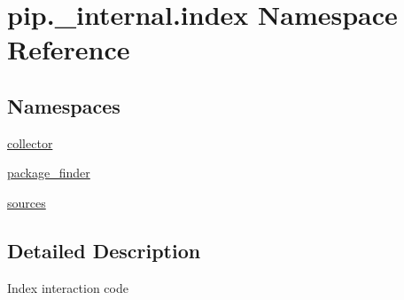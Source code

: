 \hypertarget{namespacepip_1_1__internal_1_1index}{}\section{pip.\+\_\+internal.\+index Namespace Reference}
\label{namespacepip_1_1__internal_1_1index}
\subsection*{Namespaces}
\begin{DoxyCompactItemize}
\item 
 \hyperlink{namespacepip_1_1__internal_1_1index_1_1collector}{collector}
\item 
 \hyperlink{namespacepip_1_1__internal_1_1index_1_1package__finder}{package\+\_\+finder}
\item 
 \hyperlink{namespacepip_1_1__internal_1_1index_1_1sources}{sources}
\end{DoxyCompactItemize}


\subsection{Detailed Description}
\begin{DoxyVerb}Index interaction code
\end{DoxyVerb}
 